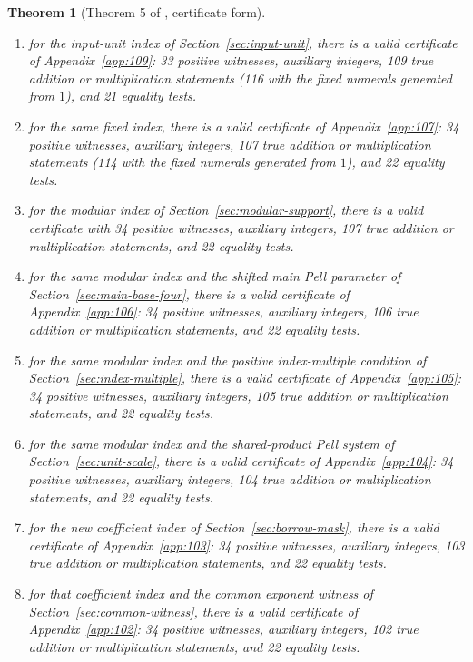 \documentclass[11pt,letterpaper]{article}
\newtheorem{theorem}{Theorem}[section]
\theoremstyle{definition}
\theoremstyle{remark}
\numberwithin{equation}{section}
\begin{document}
\begin{theorem}[Theorem 5 of \cite{J80}, certificate form]
\begin{enumerate}[nosep,label=\textup{(\alph*)}]
 witnesses, auxiliary integers, 110 true addition or multiplication
 statements \textup{(}117 with the fixed numerals generated from
 $1$\textup{)}, and 21 equality tests.
\item for the input-unit index of Section~\ref{sec:input-unit},
 there is a valid certificate of Appendix~\ref{app:109}: 33 positive
 witnesses, auxiliary integers, 109 true addition or multiplication
 statements \textup{(}116 with the fixed numerals generated from
 $1$\textup{)}, and 21 equality tests.
\item for the same fixed index, there is a valid certificate of
 Appendix~\ref{app:107}: 34 positive witnesses, auxiliary integers,
 107 true addition or multiplication statements \textup{(}114 with the
 fixed numerals generated from $1$\textup{)}, and 22 equality tests.
\item for the modular index of Section~\ref{sec:modular-support}, there
 is a valid certificate with 34 positive witnesses, auxiliary integers,
 107 true addition or multiplication statements, and 22 equality tests.
\item for the same modular index and the shifted main Pell parameter of
 Section~\ref{sec:main-base-four}, there is a valid certificate of
 Appendix~\ref{app:106}: 34 positive witnesses, auxiliary integers,
 106 true addition or multiplication statements, and 22 equality tests.
\item for the same modular index and the positive index-multiple
 condition of Section~\ref{sec:index-multiple}, there is a valid
 certificate of Appendix~\ref{app:105}: 34 positive witnesses,
 auxiliary integers, 105 true addition or multiplication statements,
 and 22 equality tests.
\item for the same modular index and the shared-product Pell system of
 Section~\ref{sec:unit-scale}, there is a valid certificate of
 Appendix~\ref{app:104}: 34 positive witnesses, auxiliary integers,
 104 true addition or multiplication statements, and 22 equality tests.
\item for the new coefficient index of Section~\ref{sec:borrow-mask},
 there is a valid certificate of Appendix~\ref{app:103}: 34 positive
 witnesses, auxiliary integers, 103 true addition or multiplication
 statements, and 22 equality tests.
\item for that coefficient index and the common exponent witness of
 Section~\ref{sec:common-witness}, there is a valid certificate of
 Appendix~\ref{app:102}: 34 positive witnesses, auxiliary integers,
 102 true addition or multiplication statements, and 22 equality tests.

\end{enumerate}
\end{theorem}
\end{document}
